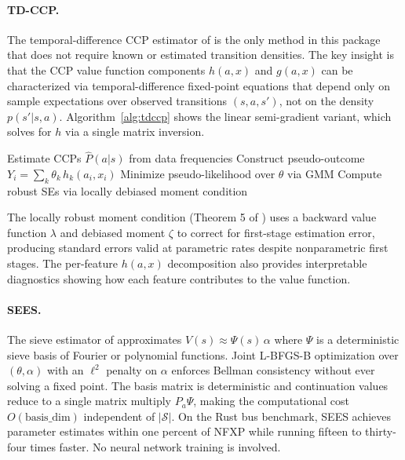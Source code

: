 \paragraph{TD-CCP.}
The temporal-difference CCP estimator of \citet{adusumilliEckardt2025} is the only method in this package that does not require known or estimated transition densities.
The key insight is that the CCP value function components $h(a,x)$ and $g(a,x)$ can be characterized via temporal-difference fixed-point equations that depend only on sample expectations over observed transitions $(s, a, s')$, not on the density $p(s'|s,a)$.
Algorithm~\ref{alg:tdccp} shows the linear semi-gradient variant, which solves for $h$ via a single matrix inversion.

\begin{algorithm}[H]
\DontPrintSemicolon
\caption{TD-CCP, linear semi-gradient \citep{adusumilliEckardt2025}}
\label{alg:tdccp}
Estimate CCPs $\hat P(a|s)$ from data frequencies\;
Construct pseudo-outcome $Y_i = \sum_k \theta_k\, h_k(a_i, x_i)$\;
Minimize pseudo-likelihood over $\theta$ via GMM\;
Compute robust SEs via locally debiased moment condition\;
\end{algorithm}

The locally robust moment condition (Theorem 5 of \citealt{adusumilliEckardt2025}) uses a backward value function $\lambda$ and debiased moment $\zeta$ to correct for first-stage estimation error, producing standard errors valid at parametric rates despite nonparametric first stages.
The per-feature $h(a,x)$ decomposition also provides interpretable diagnostics showing how each feature contributes to the value function.

\paragraph{SEES.}
The sieve estimator of \citet{luoSang2024} approximates $V(s) \approx \Psi(s)\,\alpha$ where $\Psi$ is a deterministic sieve basis of Fourier or polynomial functions.
Joint L-BFGS-B optimization over $(\theta, \alpha)$ with an $\ell^2$ penalty on $\alpha$ enforces Bellman consistency without ever solving a fixed point.
The basis matrix is deterministic and continuation values reduce to a single matrix multiply $P_a \Psi$, making the computational cost $O(\text{basis\_dim})$ independent of $|\mathcal{S}|$.
On the Rust bus benchmark, SEES achieves parameter estimates within one percent of NFXP while running fifteen to thirty-four times faster.
No neural network training is involved.


